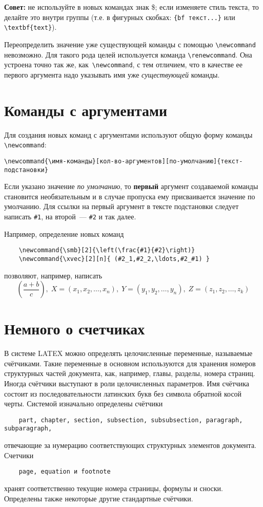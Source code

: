 \documentclass[a4paper,11pt]{article} %
\newcommand{\smb}[2]{\left(\frac{#1}{#2}\right)}
\newcommand{\xvec}[2][n]{ (#2_1,#2_2,\ldots,#2_#1) }
\begin{document}
{\bf Совет:} не используйте в новых командах знак \$; если изменяете стиль текста, то делайте это внутри группы (т.е. в фигурных скобках: \verb"{bf текст...}" или \verb'\textbf{text}'). \vspace{1cm}

Переопределить значение уже существующей команды с помощью \verb"\newcommand" невозможно. Для такого рода целей используется команда \verb"\renewcommand". Она устроена точно
так же, как~\verb"\newcommand", с тем отличием, что в качестве ее первого аргумента надо указывать имя уже {\it существующей} команды.








\section{Команды с аргументами}

Для создания новых команд с аргументами используют общую форму команды \verb"\newcommand":
\begin{center}
	\verb"\newcommand{\имя-команды}[кол-во-аргументов][по-умолчанию]{текст-подстановки}"
\end{center}

Если указано значение {\it по умолчанию}, то {\bf первый} аргумент создаваемой команды становится необязательным и в случае пропуска ему присваивается значение по умолчанию. Для ссылки на первый аргумент в тексте подстановки следует написать \verb"#1", на второй~--- \verb"#2" и так далее.

Например, определение новых команд 
\begin{verbatim}
	\newcommand{\smb}[2]{\left(\frac{#1}{#2}\right)}
	\newcommand{\xvec}[2][n]{ (#2_1,#2_2,\ldots,#2_#1) }	
\end{verbatim}
позволяют, например, написать $$\smb{a+b}{c}, \; X = \xvec{x}, \; Y = \xvec{y}, \; Z = \xvec[k]{z}$$








\section{Немного о счетчиках}

В системе LATEX можно определять целочисленные переменные, называемые счётчиками. Такие переменные в основном используются для хранения номеров структурных частей документа, как, например, главы, разделы, номера страниц. Иногда счётчики выступают в роли целочисленных параметров. Имя счётчика состоит из последовательности латинских букв без символа обратной косой черты. Системой изначально определены счётчики
\begin{verbatim}
	part, chapter, section, subsection, subsubsection, paragraph, subparagraph,
\end{verbatim}
отвечающие за нумерацию соответствующих структурных элементов документа. Счетчики 
\begin{verbatim}
	page, equation и footnote
\end{verbatim}
хранят соответственно текущие номера страницы, формулы и сноски.
Определены также некоторые другие стандартные счётчики.
\end{document}
